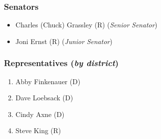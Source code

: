 \documentclass[]{article}
\begin{document}
	\subsubsection*{Senators}
		\begin{itemize}
			\item Charles (Chuck) Grassley (R) (\emph{Senior Senator})
			\item Joni Ernst (R) (\emph{Junior Senator})
		\end{itemize}
	\subsubsection*{Representatives (\emph{by district})}
		\begin{enumerate}
			\item Abby Finkenauer (D)
			\item Dave Loebsack (D)
			\item Cindy Axne (D)
			\item Steve King (R)
		\end{enumerate}
\end{document}
